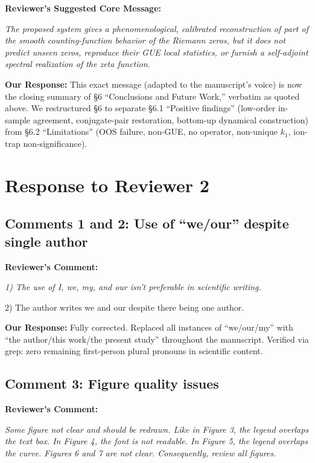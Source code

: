 \documentclass[11pt]{article}
\begin{document}
\noindent\textbf{Reviewer's Suggested Core Message:}
\begin{quotebox}
\itshape The proposed system gives a phenomenological, calibrated reconstruction of part of the smooth counting-function behavior of the Riemann zeros, but it does not predict unseen zeros, reproduce their GUE local statistics, or furnish a self-adjoint spectral realization of the zeta function.
\end{quotebox}

\noindent\textbf{Our Response:} This exact message (adapted to the manuscript's voice) is now the closing summary of \S6 ``Conclusions and Future Work,'' verbatim as quoted above. We restructured \S6 to separate \S6.1 ``Positive findings'' (low-order in-sample agreement, conjugate-pair restoration, bottom-up dynamical construction) from \S6.2 ``Limitations'' (OOS failure, non-GUE, no operator, non-unique $k_1$, ion-trap non-significance).

\section*{Response to Reviewer 2}

\subsection*{Comments 1 and 2: Use of ``we/our'' despite single author}

\noindent\textbf{Reviewer's Comment:}
\begin{quotebox}
\itshape 1) The use of I, we, my, and our isn't preferable in scientific writing.

2) The author writes we and our despite there being one author.
\end{quotebox}

\noindent\textbf{Our Response:} Fully corrected. Replaced all instances of ``we/our/my'' with ``the author/this work/the present study'' throughout the manuscript. Verified via grep: zero remaining first-person plural pronouns in scientific content.

\subsection*{Comment 3: Figure quality issues}

\noindent\textbf{Reviewer's Comment:}
\begin{quotebox}
\itshape Some figure not clear and should be redrawn. Like in Figure 3, the legend overlaps the text box. In Figure 4, the font is not readable. In Figure 5, the legend overlaps the curve. Figures 6 and 7 are not clear. Consequently, review all figures.
\end{quotebox}
\end{document}
